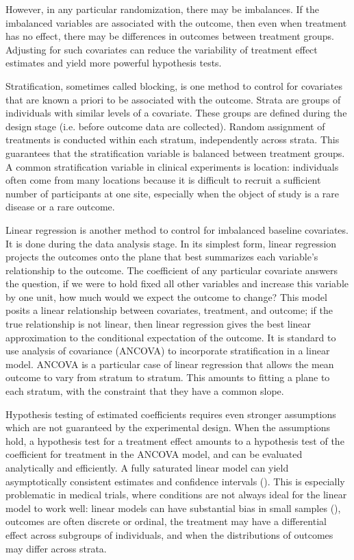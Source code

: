 \documentclass[12pt]{article}
\begin{document}
However, in any particular randomization, there may be imbalances.
If the imbalanced variables are associated with the outcome, then even when treatment has no effect, there may be differences in outcomes between treatment groups.
Adjusting for such covariates can reduce the variability of treatment effect estimates and yield more powerful hypothesis tests.

Stratification, sometimes called blocking, is one method to control for covariates that are known a priori to be associated with the outcome.
Strata are groups of individuals with similar levels of a covariate.
These groups are defined during the design stage (i.e. before outcome data are collected).
Random assignment of treatments is conducted within each stratum, independently across strata.
This guarantees that the stratification variable is balanced between treatment groups.
A common stratification variable in clinical experiments is location:
individuals often come from many locations because it is difficult to recruit a sufficient number of participants at one site,
especially when the object of study is a rare disease or a rare outcome.

Linear regression is another method to control for imbalanced baseline covariates.
It is done during the data analysis stage.
In its simplest form, linear regression projects the outcomes onto the plane that best summarizes each variable's relationship to the outcome.
The coefficient of any particular covariate answers the question, if we were to hold fixed all other variables and increase this variable by one unit, how much would we expect the outcome to change?
This model posits a linear relationship between covariates, treatment, and outcome; 
if the true relationship is not linear, then linear regression gives the best linear approximation to the conditional expectation of the outcome.
It is standard to use analysis of covariance (ANCOVA) to incorporate stratification in a linear model.
ANCOVA is a particular case of linear regression that allows the mean outcome to vary from stratum to stratum.
This amounts to fitting a plane to each stratum, with the constraint that they have a common slope.

Hypothesis testing of estimated coefficients requires even stronger assumptions which are not guaranteed by the experimental design.
When the assumptions hold, a hypothesis test for a treatment effect amounts to a hypothesis test of the coefficient for treatment in the ANCOVA model, and can be evaluated analytically and efficiently.
A fully saturated linear model can yield asymptotically consistent estimates and confidence intervals (\cite{lin_agnostic_2013}).
This is especially problematic in medical trials, where conditions are not always ideal for the linear model to work well:
linear models can have substantial bias in small samples (\cite{freedman_regression_2008}),
outcomes are often discrete or ordinal, 
the treatment may have a differential effect across subgroups of individuals, 
and when the distributions of outcomes may differ across strata.
\end{document}
